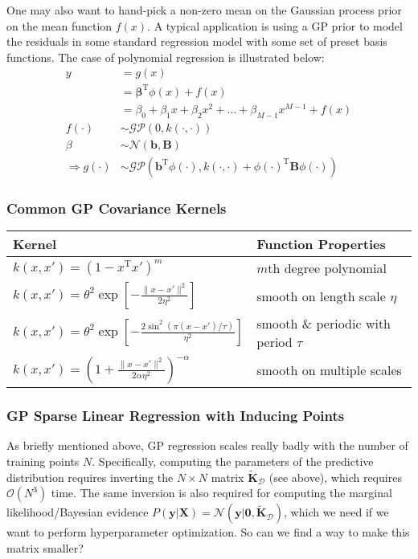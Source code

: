 \documentclass[a4paper]{article}
\begin{document}
One may also want to hand-pick a non-zero mean on the Gaussian process prior on the mean function $f(x)$. A typical application is using a GP prior to model the residuals in some standard regression model with some set of preset basis functions. The case of polynomial regression is illustrated below:
\begin{align*}
y &= g(x) \\
&= \mathbf{\beta}^\textrm{T}\phi(x) + f(x) \\
&= \beta_0 + \beta_1x + \beta_2x^2 + \ldots + \beta_{M-1} x^{M-1} + f(x) \\
f(\cdot) &\sim \mathcal{GP}\left(0,k(\cdot,\cdot)\right) \\
\beta &\sim \mathcal{N}(\mathbf{b},\mathbf{B}) \\
\Rightarrow g(\cdot) &\sim \mathcal{GP}\left(\mathbf{b}^\textrm{T}\phi(\cdot),k(\cdot,\cdot) + \phi(\cdot)^\textrm{T}\mathbf{B}\phi(\cdot)\right)
\end{align*}

\subsubsection{Common GP Covariance Kernels}
\begin{table}[H]
\centering
\begin{tabular}{l|l}
Kernel & Function Properties \\\hline
$k(x,x') = (1-x^\textrm{T}x')^m$ & $m$th degree polynomial \\
$k(x,x') = \theta^2 \exp\left[-\frac{\|x - x'\|^2}{2\eta^2}\right]$ & smooth on length scale $\eta$ \\
$k(x,x') = \theta^2 \exp\left[-\frac{2\sin^2(\pi(x-x')/\tau)}{\eta^2}\right]$ & smooth \& periodic with period $\tau$ \\
$k(x,x') = \left(1 + \frac{\|x - x'\|^2}{2\alpha\eta^2}\right)^{-\alpha}$ & smooth on multiple scales \\
\end{tabular}
\end{table}

\subsubsection{GP Sparse Linear Regression with Inducing Points}
As briefly mentioned above, GP regression scales really badly with the number of training points $N$. Specifically, computing the parameters of the predictive distribution requires inverting the $N\times N$ matrix $\tilde{\mathbf{K}}_\mathcal{D}$ (see above), which requires $\mathcal{O}(N^3)$ time. The same inversion is also required for computing the marginal likelihood/Bayesian evidence $P(\mathbf{y}|\mathbf{X}) = \mathcal{N}(\mathbf{y}|\mathbf{0},\tilde{\mathbf{K}}_\mathcal{D})$, which we need if we want to perform hyperparameter optimization. So can we find a way to make this matrix smaller?
\end{document}
